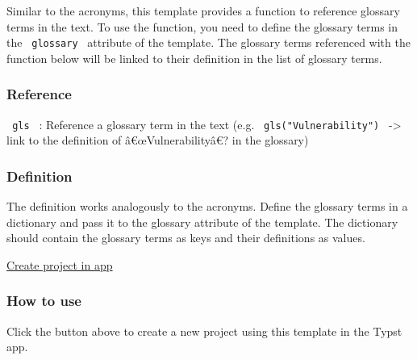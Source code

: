 Similar to the acronyms, this template provides a function to reference
glossary terms in the text. To use the function, you need to define the
glossary terms in the \texttt{\ glossary\ } attribute of the template.
The glossary terms referenced with the function below will be linked to
their definition in the list of glossary terms.

\subsubsection{Reference}\label{reference}

\texttt{\ gls\ } : Reference a glossary term in the text (e.g.
\texttt{\ gls("Vulnerability")\ } -\textgreater{} link to the definition
of â€œVulnerabilityâ€? in the glossary)

\subsubsection{Definition}\label{definition-1}

The definition works analogously to the acronyms. Define the glossary
terms in a dictionary and pass it to the glossary attribute of the
template. The dictionary should contain the glossary terms as keys and
their definitions as values.

\begin{Shaded}
\begin{Highlighting}[]
\NormalTok{)}
\end{Highlighting}
\end{Shaded}

\href{/app?template=supercharged-dhbw&version=3.3.2}{Create project in
app}

\subsubsection{How to use}\label{how-to-use}

Click the button above to create a new project using this template in
the Typst app.


